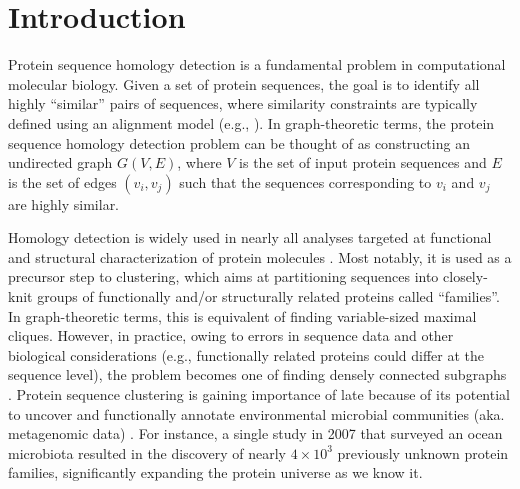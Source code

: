 \documentclass[10pt,journal,letterpaper,compsoc]{IEEEtran}
\begin{document}
\maketitle

%
\IEEEpeerreviewmaketitle

\section{Introduction}
\label{secIntroduction}

Protein sequence homology detection is a fundamental problem in computational molecular biology. Given a set of protein sequences, the goal is to identify all highly ``similar'' pairs of sequences, where similarity constraints are typically defined using an alignment model (e.g., \cite{Needleman70,Smith81}). In graph-theoretic terms, the protein sequence homology detection problem can be thought of as constructing an undirected graph $G(V,E)$, where $V$ is the set of input protein sequences and $E$ is the set of edges $(v_i,v_j)$ such that the sequences corresponding to $v_i$ and $v_j$ are highly similar.

Homology detection is widely used in nearly all analyses targeted at functional and structural characterization of protein molecules \cite{Kriventseva01}. Most notably, it is used as a precursor step to clustering, which aims at partitioning sequences into closely-knit groups of functionally and/or structurally related proteins called ``families''. In graph-theoretic terms, this is equivalent of finding variable-sized maximal cliques. However, in practice, owing to errors in sequence data and other biological considerations (e.g., functionally related proteins could differ at the sequence level), the problem becomes one of finding densely connected subgraphs \cite{Olman07,Wu08,Yooseph07}. Protein sequence clustering is gaining importance of late because of its potential to uncover and functionally annotate environmental microbial communities (aka.  metagenomic data) \cite{Handelsman04}. For instance, a single study in 2007 that surveyed an ocean microbiota \cite{Yooseph07} resulted in the discovery of nearly $4\times 10^3$ previously unknown protein families, significantly expanding the protein universe as we know it. %
\end{document}
